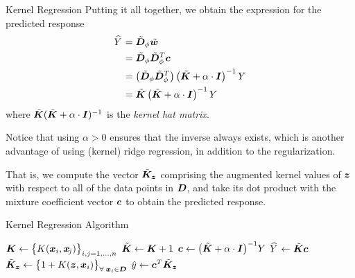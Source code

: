 \begin{frame}{Kernel Regression}
Putting it all together, 
we obtain the expression for the
predicted response
\begin{align}
    \hY & = \abD_\phi \abw \notag\\
     & = \abD_\phi \abD_\phi^T \bc \notag\\
     & = \lB(\abD_\phi \abD_\phi^T\rB) \lB(\abK + \alpha \cdot \bI\rB)^{-1} Y \notag\\
     & = \abK \lB(\abK + \alpha \cdot \bI\rB)^{-1} Y
\end{align}
where $\abK (\abK + \alpha \cdot \bI)^{-1}$ is the {\em kernel hat
    matrix}.

\medskip

    Notice that using $\alpha > 0$ ensures that  the inverse always
    exists, which is another advantage of using (kernel) ridge
    regression, in addition to the regularization.
%

\medskip

That is, we compute the vector $\abK_{\bz}$ comprising the augmented
kernel values of $\bz$ with respect to
all of the data points in $\bD$,  
and take its dot product with the mixture
coefficient vector $\bc$ to obtain the predicted response.
\end{frame}
%
%
\begin{frame}{Kernel Regression Algorithm}
\begin{tightalgo}[H]{\textwidth-18pt}
\Algorithm{} 
$\bK \assign \bigl\{K(\bx_i, \bx_{\!j})\bigr\}_{i,j=1,\ldots,n}$
\;
$\abK \assign \bK+1$\;
$\bc \assign \bigl( \abK + \alpha \cdot \bI \bigr)^{-1} Y$ \;
$\hY \assign \abK \bc$\;
\BlankLine
{}
\Algorithm{} 
$\abK_{\bz} \assign \bigl\{1 + K(\bz, \bx_i)\bigr\}_{\forall\; \bx_i \in
\bD}$\;
$\hy \assign \bc^T\abK_{\bz}$\;
\end{tightalgo}
\end{frame}
